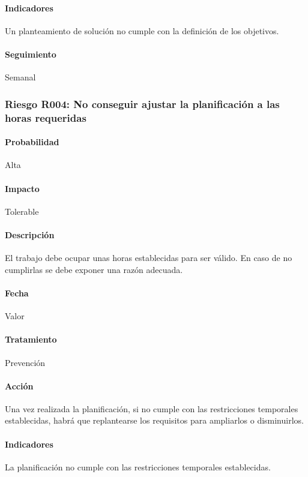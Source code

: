 \documentclass[10pt,a4paper]{article}
\begin{document}
				\paragraph{Indicadores} Un planteamiento de solución no cumple con la definición de los objetivos. %
				\paragraph{Seguimiento}	Semanal %
				
				\subsubsection{Riesgo R004: No conseguir ajustar la planificación a las horas requeridas }
				\paragraph{Probabilidad} Alta
				\paragraph{Impacto}	Tolerable
				\paragraph{Descripción} El trabajo debe ocupar unas horas establecidas para ser válido. En caso de no cumplirlas se debe exponer una razón adecuada.
				\paragraph{Fecha} Valor %
				\paragraph{Tratamiento} Prevención %
				\paragraph{Acción} Una vez realizada la planificación, si no cumple con las restricciones temporales establecidas, habrá que replantearse los requisitos para ampliarlos o disminuirlos.  %
				\paragraph{Indicadores} La planificación no cumple con las restricciones temporales establecidas. %
				
\end{document}
